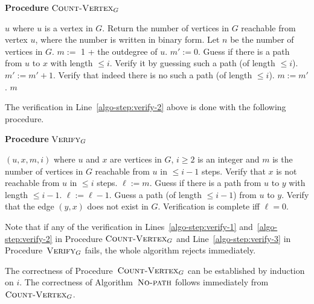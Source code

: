 \documentclass[11pt, a4paper]{article}
\begin{document}
{{\begin{algorithm}[h!]
\label{proc:count-vertex}
\caption{{\bf Procedure} $\textsc{Count-Vertex}_G$}
\begin{algorithmic}[1]
\REQUIRE
$u$ where $u$ is a vertex in $G$.
\ENSURE
Return the number of vertices in $G$ reachable from vertex $u$,
where the number is written in binary form.
\STATE
Let $n$ be the number of vertices in $G$.
\STATE
$m:=$ 1 + the outdegree of $u$.
\STATE 
{}
\STATE
$m':=0$.
\STATE
Guess if there is a path from $u$ to $x$ with length $\leq i$.
\STATE\label{algo-step:verify-1}
Verify it by guessing such a path (of length $\leq i$).
\STATE
$m':=m'+1$.
\ENDIF
{}
\STATE\label{algo-step:verify-2}
Verify that indeed there is no such a path (of length $\leq i$).
\ENDIF
\ENDFOR
\STATE $m:=m'$.
\STATE
{}
\ENDFOR
\RETURN $m$
\end{algorithmic}
\end{algorithm}
The verification in Line~\ref{algo-step:verify-2} above is done with the following procedure.
\begin{algorithm}[hb!]
\label{proc:verify}
\caption{{\bf Procedure} $\textsc{Verify}_G$}
\begin{algorithmic}[1]
\REQUIRE
$(u,x,m,i)$ where $u$ and $x$ are vertices in $G$, $i\geq 2$ is an integer and 
$m$ is the number of vertices in $G$ reachable from $u$ in $\leq i-1$ steps.
\ENSURE
Verify that $x$ is not reachable from $u$ in $\leq i$ steps.
\STATE
$\ell:= m$.
\STATE
Guess if there is a path from $u$ to $y$ with length $\leq i-1$.
\STATE
$\ell:=\ell-1$.
\STATE
Guess a path (of length $\leq i-1$) from $u$ to $y$.
\STATE\label{algo-step:verify-3}
Verify that the edge $(y,x)$ does not exist in $G$.
\ENDIF
\ENDFOR
\STATE
Verification is complete iff $\ell=0$.
\end{algorithmic} 
\end{algorithm}

Note that if any of the verification in Lines~\ref{algo-step:verify-1} and~\ref{algo-step:verify-2} in Procedure $\textsc{Count-Vertex}_G$
and Line~\ref{algo-step:verify-3} in Procedure~$\textsc{Verify}_G$ fails,
the whole algorithm rejects immediately.

The correctness of Procedure~$\textsc{Count-Vertex}_G$ can be established by induction on $i$.
The correctness of Algorithm~$\textsc{No-path}$ follows immediately from $\textsc{Count-Vertex}_G$.

}}
\end{document}
